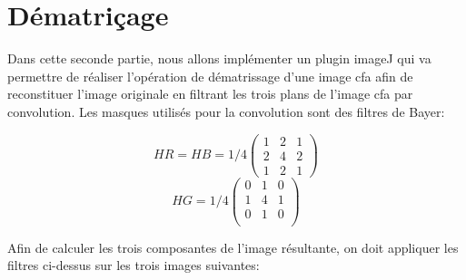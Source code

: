 \documentclass[a4paper,12pt]{report}
\begin{document}
\section*{Dématriçage}

Dans cette seconde partie, nous allons implémenter un plugin imageJ qui va permettre de réaliser l'opération de dématrissage d'une image cfa afin de reconstituer l'image originale en filtrant les trois plans de l'image cfa par convolution. Les masques utilisés pour la convolution sont des filtres de Bayer:
\begin{center}
\[
	HR=HB=1/4 \left (
	\begin{array}{ccc}
		1 & 2 & 1\\
        2 & 4 & 2\\
        1 & 2 & 1
	\end{array}
	\right )
\]
\[
	HG=1/4 \left (
	\begin{array}{ccc}
		0 & 1 & 0\\
        1 & 4 & 1\\
        0 & 1 & 0\\ 
	\end{array}
	\right )
\]
\end{center}

Afin de calculer les trois composantes de l'image résultante, on doit appliquer les filtres ci-dessus sur les trois images suivantes:
\end{document}

